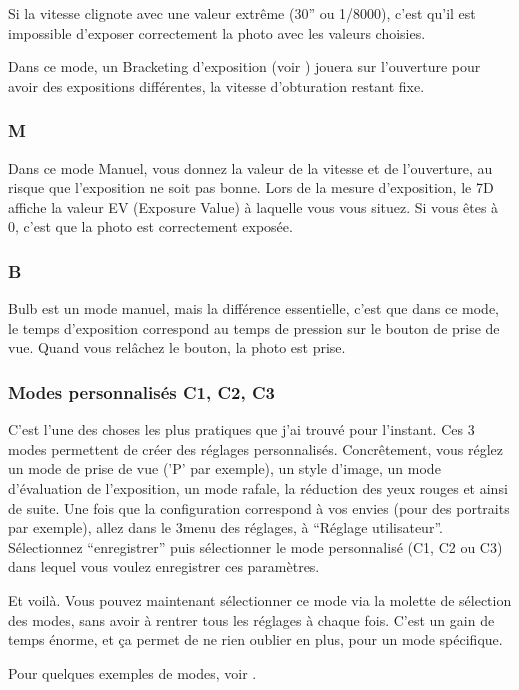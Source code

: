 \documentclass[a4paper,twoside]{article}
\begin{document}
Si la vitesse clignote avec une valeur extrême (30'' ou 1/8000), c'est qu'il est impossible d'exposer correctement la photo avec les valeurs choisies.

Dans ce mode, un Bracketing d'exposition (voir ) jouera sur l'ouverture pour avoir des expositions différentes, la vitesse d'obturation restant fixe.

\subsubsection{M}
Dans ce mode Manuel, vous donnez la valeur de la vitesse et de l'ouverture, au risque que l'exposition ne soit pas bonne. Lors de la mesure d'exposition, le 7D affiche la valeur EV (Exposure Value) à laquelle vous vous situez. Si vous êtes à 0, c'est que la photo est correctement exposée.

\subsubsection{B}
Bulb est un mode manuel, mais la différence essentielle, c'est que dans ce mode, le temps d'exposition correspond au temps de pression sur le bouton de prise de vue. Quand vous relâchez le bouton, la photo est prise.

\subsubsection{Modes personnalisés C1, C2, C3}
C'est l'une des choses les plus pratiques que j'ai trouvé pour l'instant. Ces 3 modes permettent de créer des réglages personnalisés. Concrêtement, vous réglez un mode de prise de vue ('P' par exemple), un style d'image, un mode d'évaluation de l'exposition, un mode rafale, la réduction des yeux rouges et ainsi de suite. Une fois que la configuration correspond à vos envies (pour des portraits par exemple), allez dans le 3\ieme menu des réglages, à ``Réglage utilisateur''. Sélectionnez ``enregistrer'' puis sélectionner le mode personnalisé (C1, C2 ou C3) dans lequel vous voulez enregistrer ces paramètres. 

Et voilà. Vous pouvez maintenant sélectionner ce mode via la molette de sélection des modes, sans avoir à rentrer tous les réglages à chaque fois. C'est un gain de temps énorme, et ça permet de ne rien oublier en plus, pour un mode spécifique.

Pour quelques exemples de modes, voir .
\end{document}
